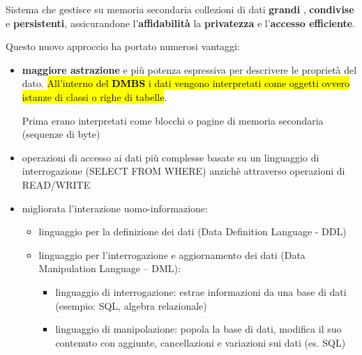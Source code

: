\documentclass[a4paper, 12pt]{book}
\begin{document}

    \vspace{15pt}

    \begin{tcolorbox}[
      colback=cyan!5!white,
      colframe=blue!50!black,
      title=\textbf{Definizione - DBMS},
      coltitle=white,
      fonttitle=\bfseries,
      arc=3mm,
      boxrule=0.5pt,
      enhanced,
      breakable
    ]
    Sistema che gestisce su memoria secondaria collezioni di dati \textbf{grandi} , \textbf{condivise} e \textbf{persistenti}, assicurandone l'\textbf{affidabilità} la \textbf{privatezza} e l'\textbf{accesso efficiente}.
    \end{tcolorbox}

    \vspace{15pt}



    Questo nuovo approccio ha portato numerosi vantaggi:
    \begin{itemize}
      \item \textbf{maggiore astrazione} e più potenza espressiva per descrivere le proprietà del dato.
      \hl{All'interno del \textbf{DMBS} i dati vengono interpretati come oggetti ovvero istanze di classi o righe di tabelle}.
      
      Prima erano interpretati come blocchi o pagine di memoria secondaria (sequenze di byte)

      \item operazioni di accesso ai dati più complesse basate su un linguaggio di interrogazione (SELECT FROM WHERE) anzichè attraverso operazioni di READ/WRITE
      \item migliorata l'interazione uomo-informazione: 
      \begin{itemize}
        \item linguaggio per la definizione dei dati (Data Definition Language - DDL)
        \item linguaggio per l’interrogazione e aggiornamento dei dati (Data Manipulation Language – DML): 
        \begin{itemize}
          \item linguaggio di interrogazione: estrae informazioni da una base di dati (esempio: SQL, algebra relazionale)
          \item linguaggio di manipolazione: popola la base di dati, modifica il suo contenuto con aggiunte, cancellazioni e variazioni sui dati (es. SQL)
        \end{itemize}
      \end{itemize}
    \end{itemize}
\end{document}
